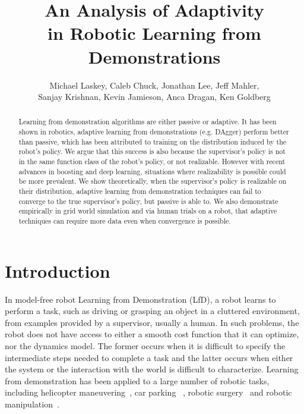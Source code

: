 \documentclass[10pt, conference]{ieeeconf}      %
\title{An Analysis of Adaptivity
 \\in  Robotic Learning from Demonstrations}
\author{Michael Laskey, Caleb Chuck, Jonathan Lee, Jeff Mahler,\\ Sanjay Krishnan, Kevin Jamieson, Anca Dragan, Ken Goldberg}
\begin{document}
\maketitle
\thispagestyle{empty}
\pagestyle{empty}







\begin{abstract}
Learning from demonstration algorithms are either passive or adaptive. It has been shown in robotics, adaptive learning from demonstrations (e.g. DAgger) perform better than passive, which has been attributed to training on the distribution induced by the robot's policy. We argue that this success is also because the supervisor's policy  is not in the same function class of the robot's policy, or not realizable. However with recent advances in boosting and deep learning, situations where realizability is possible could be more prevalent.  We show theoretically, when the supervisor's policy is realizable on their distribution, adaptive learning from demonstration techniques can fail to converge to the true supervisor's policy, but passive is able to. We also demonstrate empirically in grid world simulation and via human trials on a robot, that adaptive techniques can require more data even when convergence is possible.
 \end{abstract}


\section{Introduction} 
In model-free robot Learning from Demonstration (LfD), a robot learns to perform a task, such as driving or grasping an object in a cluttered environment, from examples provided by a  supervisor, usually a human. In such problems, the robot does not have access to either a smooth cost function that it can optimize, nor the dynamics model. The former occurs when it is difficult to specify the intermediate steps needed to complete a task and the latter occurs when either the system or the interaction with the world is difficult to characterize. Learning from demonstration has been applied to a large number of robotic tasks, including helicopter maneuvering~\cite{abbeel2007application}, car parking~\cite{abbeel2008apprenticeship} , robotic surgery~\cite{van2010superhuman,laskeyshiv} and robotic manipulation~\cite{laskeyrobot}.
\end{document}
